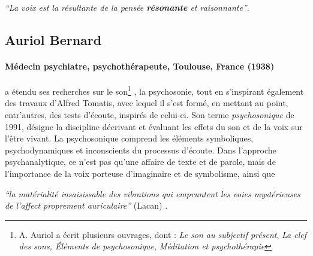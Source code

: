  \textit{``La voix est la
      résultante de la pensée \textbf{résonante}  et raisonnante''}. \autocite{bonhomme-key}
      \subsection{Auriol Bernard}

\paragraph{Médecin psychiatre,
   psychothérapeute, Toulouse, France (1938)}
a étendu ses recherches sur le son\footnote{A. Auriol a écrit plusieurs ouvrages, dont : \textsl{Le son au subjectif présent}, \textsl{La clef des sons, Éléments de psychosonique}, \textsl{Méditation et
  psychothérapie}} \autocite{auriol_stress}, la psychosonie,
tout en s'inspirant également des
travaux d'Alfred Tomatis, avec lequel il s'est formé, en mettant au
point, entr'autres, des tests
d'écoute, inspirés de celui-ci.
Son terme \emph{psychosonique} de 1991,
désigne la discipline décrivant et évaluant les effets du
son et de la voix sur l'être vivant.
La psychosonique comprend les éléments
symboliques, psychodynamiques et inconscients du processus
d'écoute.
Dans l'approche  psychanalytique, ce n'est pas qu'une affaire de
texte et de parole, mais de l'importance de la voix porteuse
d'imaginaire et de symbolisme, ainsi que

\textsf{\textit{``la matérialité insaisissable
  des vibrations qui empruntent  les voies mystérieuses de
l'affect proprement auriculaire''}
(Lacan)}
\autocite[ch. 13]{auriol:cle}.





